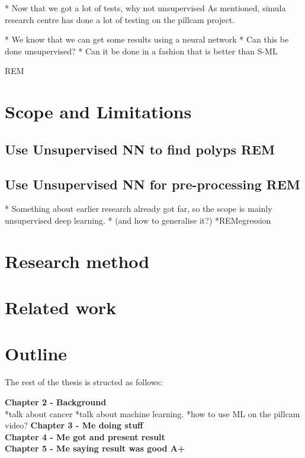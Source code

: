     
    
    
    * Now that we got a lot of tests, why not unsupervised
    As mentioned, simula research centre has done a lot of testing on the pillcam project.
		  
		* We know that we can get some results using a neural network
		* Can this be done unsupervised?
		* Can it be done in a fashion that is better than S-ML
		 
		 REM

		
\section{Scope and Limitations}
  \subsection{Use Unsupervised NN to find polyps REM}
  \subsection{Use Unsupervised NN for pre-processing REM}
		* Something about earlier research already got far, so the scope is mainly unsupervised deep learning.
		* (and how to generalise it?)
		*REMegression	
		

\section{Research method}
\section{Related work}
\section{Outline}
  The rest of the thesis is structed as follows:
	
  \textbf{Chapter 2 - Background}\\
	*talk about cancer
	*talk about machine learning.
	*how to use ML on the pillcam video?
  \textbf{Chapter 3 - Me doing stuff}\\
  \textbf{Chapter 4 - Me got and present result}\\
  \textbf{Chapter 5 - Me saying result was good A+}\\
